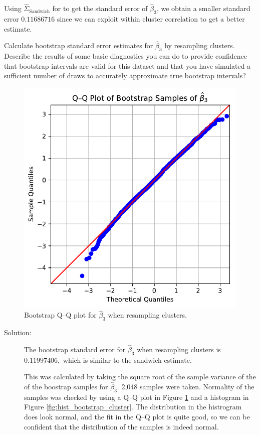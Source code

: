 \documentclass[11pt, letterpaper]{article}
\begin{document}
\begin{enumerate}[(a)]
\begin{description}
  Using $\hat{\Sigma}_{\text{Sandwich}}$ for to get the standard error of
  $\hat{\beta}_3$, we obtain a smaller standard error $\boxed{0.11686716}$ since
  we can exploit within cluster correlation to get a better estimate.
\end{description}
{\em \item Calculate bootstrap standard error estimates 
for $\hat{\beta}_3$ by resampling clusters.  Describe the results of some basic diagnostics you can do to provide confidence that
bootstrap intervals are valid for this dataset and that you have simulated a sufficient number 
of draws to accurately approximate true bootstrap intervals?}

\begin{figure}
  \centering
  \includegraphics{qq_bootstrap_cluster.pdf}
  \caption{Bootstrap Q--Q plot for $\hat\beta_3$ when resampling clusters.}
  \label{fig:qq_bootstrap_cluster}
\end{figure}

\begin{description}
\item[Solution:] The bootstrap standard error for $\hat{\beta}_3$ when
  resampling clusters is $\boxed{0.11997406,}$ which is similar to the
  sandwich estimate.

  This was calculated by taking the square root of the sample variance of the of
  the boostrap samples for $\hat{\beta}_3$. 2,048 samples were taken. Normality
  of the samples was checked by using a Q--Q plot in Figure
  \ref{fig:qq_bootstrap_cluster} and a histogram in Figure
  \ref{fig:hist_bootstrap_cluster}. The distribution in the histrogram does look
  normal, and the fit in the Q--Q plot is quite good, so we can be confident
  that the distribution of the samples is indeed normal.


\end{description}
\end{enumerate}
\end{document}
